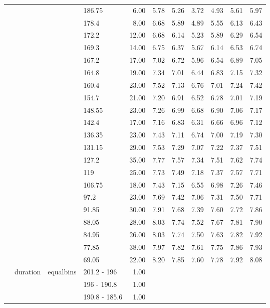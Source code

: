 \begin{longtable}{llllrrrrrrr}
   &  &  & 186.75 & 6.00 & 5.78 & 5.26 & 3.72 & 4.93 & 5.61 & 5.97 \\ 
   &  &  & 178.4 & 8.00 & 6.68 & 5.89 & 4.89 & 5.55 & 6.13 & 6.43 \\ 
   &  &  & 172.2 & 12.00 & 6.68 & 6.14 & 5.23 & 5.89 & 6.29 & 6.54 \\ 
   &  &  & 169.3 & 14.00 & 6.75 & 6.37 & 5.67 & 6.14 & 6.53 & 6.74 \\ 
   &  &  & 167.2 & 17.00 & 7.02 & 6.72 & 5.96 & 6.54 & 6.89 & 7.05 \\ 
   &  &  & 164.8 & 19.00 & 7.34 & 7.01 & 6.44 & 6.83 & 7.15 & 7.32 \\ 
   &  &  & 160.4 & 23.00 & 7.52 & 7.13 & 6.76 & 7.01 & 7.24 & 7.42 \\ 
   &  &  & 154.7 & 21.00 & 7.20 & 6.91 & 6.52 & 6.78 & 7.01 & 7.19 \\ 
   &  &  & 148.55 & 23.00 & 7.26 & 6.99 & 6.68 & 6.90 & 7.06 & 7.17 \\ 
   &  &  & 142.4 & 17.00 & 7.16 & 6.83 & 6.31 & 6.66 & 6.96 & 7.12 \\ 
   &  &  & 136.35 & 23.00 & 7.43 & 7.11 & 6.74 & 7.00 & 7.19 & 7.30 \\ 
   &  &  & 131.15 & 29.00 & 7.53 & 7.29 & 7.07 & 7.22 & 7.37 & 7.51 \\ 
   &  &  & 127.2 & 35.00 & 7.77 & 7.57 & 7.34 & 7.51 & 7.62 & 7.74 \\ 
   &  &  & 119 & 25.00 & 7.73 & 7.49 & 7.18 & 7.37 & 7.57 & 7.71 \\ 
   &  &  & 106.75 & 18.00 & 7.43 & 7.15 & 6.55 & 6.98 & 7.26 & 7.46 \\ 
   &  &  & 97.2 & 23.00 & 7.69 & 7.42 & 7.06 & 7.31 & 7.50 & 7.71 \\ 
   &  &  & 91.85 & 30.00 & 7.91 & 7.68 & 7.39 & 7.60 & 7.72 & 7.86 \\ 
   &  &  & 88.05 & 28.00 & 8.03 & 7.74 & 7.52 & 7.67 & 7.81 & 7.90 \\ 
   &  &  & 84.95 & 26.00 & 8.03 & 7.74 & 7.50 & 7.63 & 7.82 & 7.92 \\ 
   &  &  & 77.85 & 38.00 & 7.97 & 7.82 & 7.61 & 7.75 & 7.86 & 7.93 \\ 
   &  &  & 69.05 & 22.00 & 8.20 & 7.85 & 7.60 & 7.78 & 7.92 & 8.08 \\ 
   & duration & equalbins & 201.2 - 196 & 1.00 &  &  &  &  &  &  \\ 
   &  &  & 196 - 190.8 & 1.00 &  &  &  &  &  &  \\ 
   &  &  & 190.8 - 185.6 & 1.00 &  &  &  &  &  &  \\ 

\end{longtable}
